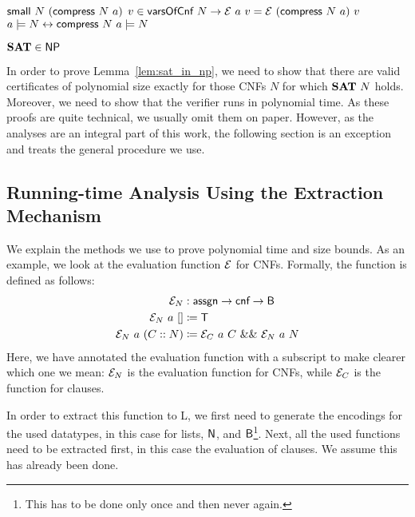 \begin{lemma}\leavevmode
  \begin{enumerate}
     $\textsf{small}~N~(\textsf{compress}~N~a)$
     $v \in \textsf{varsOfCnf}~N \rightarrow \mathcal{E}~a~v = \mathcal{E}~(\textsf{compress}~N~a)~v$
     $a \models N \leftrightarrow \textsf{compress}~N~a \models N$
  \end{enumerate}
\end{lemma}

\begin{lemma}[\SAT{} is in \NP{}][sat_NP]\label{lem:sat_in_np}
  $\textbf{SAT}{} \in \normalfont{\textsf{NP}{}}$
\end{lemma}

In order to prove Lemma~\ref{lem:sat_in_np}, we need to show that there are valid certificates of polynomial size exactly for those CNFs $N$ for which $\textbf{SAT}{}~N$ holds. 
Moreover, we need to show that the verifier runs in polynomial time. 
As these proofs are quite technical, we usually omit them on paper. However, as the analyses are an integral part of this work, the following section is an exception and treats the general procedure we use.

\subsection{Running-time Analysis Using the Extraction Mechanism}
  We explain the methods we use to prove polynomial time and size bounds. 
  As an example, we look at the evaluation function $\mathcal{E}$ for CNFs. 
  Formally, the function is defined as follows:
  \begin{align*}
    \mathcal{E}_N &: \textsf{assgn} \rightarrow \textsf{cnf} \rightarrow \textsf{B} \\
    \mathcal{E}_N~a~[] &\coloneqq \mathsf{T} \\
    \mathcal{E}_N~a~(C::N) &\coloneqq \mathcal{E}_C~a~C~\&\&~\mathcal{E}_N~a~N
  \end{align*}
  Here, we have annotated the evaluation function with a subscript to make clearer which one we mean: $\mathcal{E}_N$ is the evaluation function for CNFs, while $\mathcal{E}_C$ is the function for clauses.

  In order to extract this function to L, we first need to generate the encodings for the used datatypes, in this case for lists, $\mathsf{N}$, and $\textsf{B}$\footnote{This has to be done only once and then never again.}. 
  Next, all the used functions need to be extracted first, in this case the evaluation of clauses. We assume this has already been done. 

